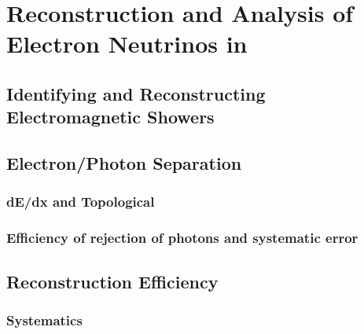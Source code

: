 \chapter{Reconstruction and Analysis of Electron Neutrinos in \argoneut }

\label{chp:electrons}

\section{Identifying and Reconstructing Electromagnetic Showers}

\section{Electron/Photon Separation}
\label{sec:e_gamma_sep}
\subsection{dE/dx and Topological}
\subsection{Efficiency of rejection of photons and systematic error}

\section{Reconstruction Efficiency}
\subsection{Systematics}